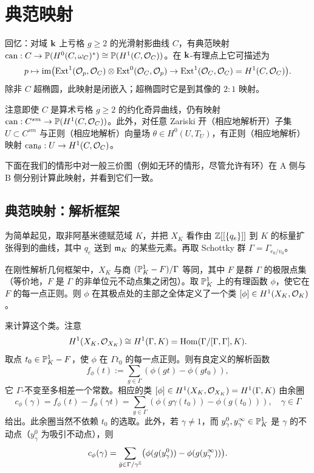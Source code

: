 \section{典范映射}\label{s:canonicalmap}

回忆：对域 $\mathbf{k}$ 上亏格 $g\geq 2$ 的光滑射影曲线 $C$，有典范映射 $\operatorname{can}:C\to \mathbb{P}(H^0(C,\omega_C)^*)\cong \mathbb{P}(H^1(C,\mathcal{O}_C))$。在 $\mathbf{k}$-有理点上它可描述为
\[
p\mapsto \operatorname{im}\bigl(\operatorname{Ext}^1(\mathcal{O}_p,\mathcal{O}_C)\otimes\operatorname{Ext}^0(\mathcal{O}_C,\mathcal{O}_p)\to \operatorname{Ext}^1(\mathcal{O}_C,\mathcal{O}_C)=H^1(C,\mathcal{O}_C)\bigr).
\]
除非 $C$ 超椭圆，此映射是闭嵌入；超椭圆时它是到其像的 $2:1$ 映射。

注意即使 $C$ 是算术亏格 $g\geq 2$ 的约化奇异曲线，仍有映射 $\operatorname{can}:C^{sm}\to \mathbb{P}(H^1(C,\mathcal{O}_C))$。此外，对任意 Zariski 开（相应地解析开）子集 $U\subset C^{sm}$ 与正则（相应地解析）向量场 $\theta\in H^0(U,T_U)$，有正则（相应地解析）映射 $\operatorname{can}_{\theta}:U\to H^1(C,\mathcal{O}_C)$。

下面在我们的情形中对一般三价图（例如无环的情形，尽管允许有环）在 A 侧与 B 侧分别计算此映射，并看到它们一致。

\subsection{典范映射：解析框架}\label{ss:cananalytic}

为简单起见，取非阿基米德赋范域 $K$，并把 $X_K$ 看作由 $\mathbb{Z}[[\{q_{e}\}]]$ 到 $K$ 的标量扩张得到的曲线，其中 $q_{e}$ 送到 $\mathfrak{m}_K$ 的某些元素。再取 Schottky 群 $\Gamma=\Gamma_{e_0/v_0}$。

在刚性解析几何框架中，$X_K$ 与商 $(\mathbb{P}^1_K-F)/\Gamma$ 等同，其中 $F$ 是群 $\Gamma$ 的极限点集（等价地，$F$ 是 $\Gamma$ 的非单位元不动点集之闭包）。取 $\mathbb{P}^1_K$ 上的有理函数 $\phi$，使它在 $F$ 的每一点正则。则 $\phi$ 在其极点处的主部之全体定义了一个类 $[\phi]\in H^1(X_K,\mathcal{O}_K)$。

来计算这个类。注意
\[
H^1(X_K,\mathcal{O}_{X_K})\cong H^1(\Gamma,K)=\operatorname{Hom}(\Gamma/[\Gamma,\Gamma],K).
\]
取点 $t_0\in \mathbb{P}^1_K-F$，使 $\phi$ 在 $\Gamma t_0$ 的每一点正则。则有良定义的解析函数
\[
f_{\phi}(t):=\sum_{g\in\Gamma} (\phi(gt)-\phi(gt_0)),
\]
它 $\Gamma$-不变至多相差一个常数。相应的类 $[\phi]\in H^1(X_K,\mathcal{O}_{X_K})=H^1(\Gamma,K)$ 由余圈
\begin{equation}
c_{\phi}(\gamma)=f_{\phi}(t)-f_{\phi}(\gamma t)=\sum_{g\in\Gamma}(\phi(g\gamma(t_0))-\phi(g(t_0))),\quad \gamma\in\Gamma
\end{equation}
给出。此余圈当然不依赖 $t_0$ 的选取。此外，若 $\gamma\neq 1$，而 $y_{\gamma}^0,y_{\gamma}^{\infty}\in \mathbb{P}^1_K$ 是 $\gamma$ 的不动点（$y_{\gamma}^0$ 为吸引不动点），则
\begin{equation}
c_{\phi}(\gamma)=\sum_{\bar{g}\in\Gamma/\gamma^{\mathbb{Z}}}\bigl(\phi(g(y_{\gamma}^0))-\phi(g(y_{\gamma}^{\infty}))\bigr).
\end{equation}

